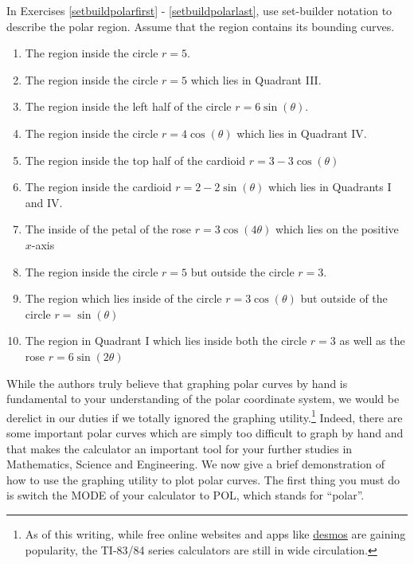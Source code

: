 \documentclass{ximera}
\begin{document}
In Exercises \ref{setbuildpolarfirst} - \ref{setbuildpolarlast}, use set-builder notation to describe the polar region.  Assume that the region contains its bounding curves.

\begin{enumerate}

\setcounter{enumi}{\value{HW}}

\item The region inside the circle $r = 5$. \label{setbuildpolarfirst}
\item The region inside the circle $r=5$ which lies in Quadrant III.
\item The region inside the left half of the circle $r = 6\sin(\theta)$.
\item The region inside the circle $r = 4\cos(\theta)$ which lies in Quadrant IV.
\item The region inside the top half of the cardioid $r = 3 - 3\cos(\theta)$
\item The region inside the cardioid $r = 2-2\sin(\theta)$ which lies in Quadrants I and IV.
\item The inside of the petal of the rose $r = 3\cos(4\theta)$ which lies on the positive $x$-axis
\item The region inside the circle $r=5$ but outside the circle $r=3$.
\item The region which lies inside of the circle $r = 3\cos(\theta)$ but outside of the circle $r = \sin(\theta)$
\item The region in Quadrant I which lies inside both the circle $r=3$ as well as the rose $r = 6\sin(2\theta)$ \label{setbuildpolarlast}

\setcounter{HW}{\value{enumi}}

\end{enumerate}

\label{polargraphscalculator}
While the authors truly believe that graphing polar curves by hand is fundamental to your understanding of the polar coordinate system, we would be derelict in our duties if we totally ignored the graphing utility.\footnote{As of this writing, while free online websites and apps like \href{https://www.desmos.com/}{\underline{desmos}} are gaining popularity, the TI-83/84 series calculators are still in wide circulation.} Indeed, there are some important polar curves which are simply too difficult to graph by hand and that makes the calculator an important tool for your further studies in Mathematics, Science and Engineering.  We now give a brief demonstration of how to use the graphing utility to plot polar curves.  The first thing you must do is switch the MODE of your calculator to POL, which stands for ``polar''. 
\end{document}
